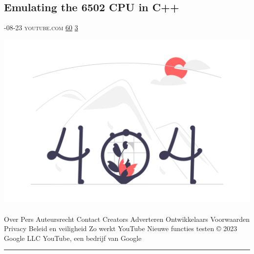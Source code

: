 \documentclass[10pt,a4paper]{article}
\begin{document}
\begin{multicols*}{2}
\begin{minipage}{\linewidth}
\subsection{Emulating the 6502 CPU in C++}
\textsc{\footnotesize
{\scriptsize\faCalendar}-08-23 
{\scriptsize\faYoutube}\space 
youtube.com 
{\scriptsize\faThumbsOUp}\space 
\href{http://news.ycombinator.com/item?id=37172769\&utm\_term=comment}{60} 
{\scriptsize\faComments}\space 
\href{http://news.ycombinator.com/item?id=37172769\&utm\_term=comment}{3} 
}
\par\medskip\noindent
\href{https://www.youtube.com/watch?v=qJgsuQoy9bc\&utm\_source=hackernewsletter\&utm\_medium=email\&utm\_term=watching}{
    \includegraphics[width=0.99\linewidth]{notfound.png}
}
\end{minipage}
\paragraph{}
Over
Pers
Auteursrecht
Contact
Creators
Adverteren
Ontwikkelaars
Voorwaarden
Privacy
Beleid en veiligheid
Zo werkt YouTube
Nieuwe functies testen
© 2023 Google LLC
YouTube, een bedrijf van Google
\par\noindent\textcolor{red}{\rule{\linewidth}{0.2mm}}
\vfill
\null
\noindent\begin{minipage}{\linewidth}

\end{minipage}
\end{multicols*}
\end{document}
